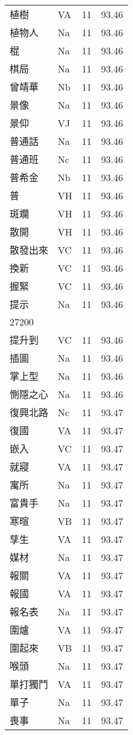 \documentclass[twocolumn]{book}
\begin{document}
\begin{supertabular}{llrr}
植樹 & VA & 11 &  93.46\\
植物人 & Na & 11 &  93.46\\
棍 & Na & 11 &  93.46\\
棋局 & Na & 11 &  93.46\\
曾靖華 & Nb & 11 &  93.46\\
景像 & Na & 11 &  93.46\\
景仰 & VJ & 11 &  93.46\\
普通話 & Na & 11 &  93.46\\
普通班 & Nc & 11 &  93.46\\
普希金 & Nb & 11 &  93.46\\
普 & VH & 11 &  93.46\\
斑斕 & VH & 11 &  93.46\\
散開 & VH & 11 &  93.46\\
散發出來 & VC & 11 &  93.46\\
換新 & VC & 11 &  93.46\\
握緊 & VC & 11 &  93.46\\
提示 & Na & 11 &  93.46\\
27200\\
提升到 & VC & 11 &  93.46\\
插圖 & Na & 11 &  93.46\\
掌上型 & Na & 11 &  93.46\\
惻隱之心 & Na & 11 &  93.46\\
復興北路 & Nc & 11 &  93.47\\
復國 & VA & 11 &  93.47\\
嵌入 & VC & 11 &  93.47\\
就寢 & VA & 11 &  93.47\\
寓所 & Na & 11 &  93.47\\
富貴手 & Na & 11 &  93.47\\
寒暄 & VB & 11 &  93.47\\
孳生 & VA & 11 &  93.47\\
媒材 & Na & 11 &  93.47\\
報關 & VA & 11 &  93.47\\
報國 & VA & 11 &  93.47\\
報名表 & Na & 11 &  93.47\\
圍爐 & VA & 11 &  93.47\\
圍起來 & VB & 11 &  93.47\\
喉頭 & Na & 11 &  93.47\\
單打獨鬥 & VA & 11 &  93.47\\
單子 & Na & 11 &  93.47\\
喪事 & Na & 11 &  93.47\\

\end{supertabular}
\end{document}
